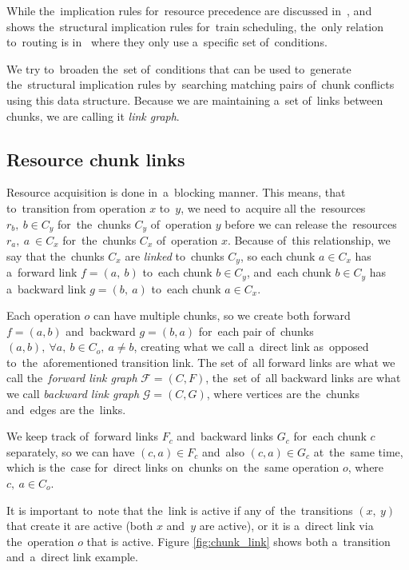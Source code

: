 While the~implication rules for~resource precedence are discussed in~\textcite{MASCIS2002498}, and~\textcite{dariano2008improving} shows the~structural implication rules for~train scheduling, the~only relation to~routing is in~\textcite{Dubach2025handling} where they only use a~specific set of~conditions.

We try to~broaden the~set of~conditions that can be used to~generate the~structural implication rules by~searching matching pairs of~chunk conflicts using this data structure. Because we are maintaining a~set of~links between chunks, we are calling it \emph{link graph}. 

\subsection{Resource chunk links}
Resource acquisition is done in~a~blocking manner. This means, that to~transition from operation $x$ to~$y$, we need to~acquire all the~resources $r_{b},\ b \in C_{y} $ for~the~chunks $C_{y}$ of~operation $y$ before we can release the~resources $r_{a},\ a~\in C_{x}$ for~the~chunks $C_x$ of~operation $x$. Because of~this relationship, we say that the~chunks $C_{x}$ are \emph{linked} to~chunks $C_{y}$, so each chunk $a \in C_{x}$ has a~forward link $f = (a,\ b)$ to~each chunk $b \in C_{y}$, and~each chunk $b \in C_{y}$ has a~backward link $g = (b,\ a)$ to~each chunk $a \in C_{x}$.

Each operation $o$ can have multiple chunks, so we create both forward $f = (a, b)$ and~backward $g = (b, a)$ for~each pair of~chunks $(a, b),\ \forall a,\ b \in C_o,\ a\neq b$, creating what we call a~direct link as~opposed to~the~aforementioned transition link. The set of~all forward links are what we call the~\emph{forward link graph} $\mathcal{F} = (C, F)$, the~set of~all backward links are what we call \emph{backward link graph} $\mathcal{G} = (C, G)$, where vertices are the~chunks and~edges are the~links.

\begin{remark}
We keep track of~forward links $F_c$ and~backward links $G_c$ for~each chunk $c$ separately, so we can have $(c, a) \in F_c$ and~also $(c, a) \in G_c$ at~the~same time, which is the~case for~direct links on~chunks on~the~same operation $o$, where $c,\ a \in C_o$. 
\end{remark}

It is important to~note that the~link is active if any of~the~transitions $(x,\ y)$ that create it are active (both $x$ and~$y$ are active), or it is a~direct link via the~operation $o$ that is active. Figure \ref{fig:chunk_link} shows both a~transition and~a~direct link example.

